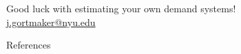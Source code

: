\documentclass[aspectratio=169,t,11pt,table]{beamer}
\begin{document}
\begin{frame}[c]{}
    \begin{center}
        Good luck with estimating your own demand systems! \\[\baselineskip]
        \href{mailto:j.gortmaker@nyu.edu}{j.gortmaker@nyu.edu}
    \end{center}
\end{frame}

\backupbegin

\begin{frame}{References}
    
\end{frame}

\backupend
\end{document}
